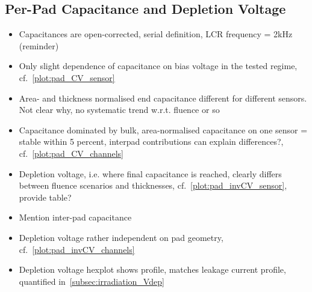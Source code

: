 \subsection{Per-Pad Capacitance and Depletion Voltage}
\label{subsec:QA_Vdep}

\begin{itemize}
	\item Capacitances are open-corrected, serial definition, LCR frequency = 2kHz (reminder)
	\item Only slight dependence of capacitance on bias voltage in the tested regime, cf.~\ref{plot:pad_CV_sensor}
	\item Area- and thickness normalised end capacitance different for different sensors. Not clear why, no systematic trend w.r.t. fluence or so
	\item Capacitance dominated by bulk, area-normalised capacitance on one sensor = stable within 5 percent, interpad contributions can explain differences?, cf.~\ref{plot:pad_CV_channels}
	\item Depletion voltage, i.e. where final capacitance is reached, clearly differs between fluence scenarios and thicknesses, cf.~\ref{plot:pad_invCV_sensor}, provide table?
	\item Mention inter-pad capacitance
	\item Depletion voltage rather independent on pad geometry, cf.~\ref{plot:pad_invCV_channels}
	\item Depletion voltage hexplot shows profile, matches leakage current profile, quantified in~\ref{subsec:irradiation_Vdep}
\end{itemize}

